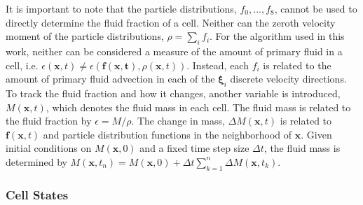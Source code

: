 \documentclass[pdftex,ms]{pittetd}
\newcommand{\pos}{\mathbf{x}}
\newcommand{\pvel}{\boldsymbol{\xi}}
\begin{document}
It is important to note that the particle distributions, $f_0, ..., f_8$, cannot be used to directly determine the fluid fraction of a cell.
Neither can the zeroth velocity moment of the particle distributions, $\rho = \sum_i f_i$.
For the algorithm used in this work, neither can be considered a measure of the amount of primary fluid in a cell, i.e. $\epsilon(\pos, t) \neq \epsilon(\mathbf{f(\pos, t)}, \rho(\pos, t))$.
Instead, each $f_i$ is related to the amount of primary fluid advection in each of the $\pvel_i$ discrete velocity directions.
To track the fluid fraction and how it changes, another variable is introduced, $M(\pos, t)$, which denotes the fluid mass in each cell.
The fluid mass is related to the fluid fraction by $\epsilon = M / \rho$.
The change in mass, $\Delta M(\pos, t)$ is related to $\mathbf{f}(\pos, t)$ and particle distribution functions in the neighborhood of $\pos$.
Given initial conditions on $M(\pos, 0)$ and a fixed time step size $\Delta t $, the fluid mass is determined by $M(\pos, t_n) = M(\pos, 0) + \Delta t \sum_{k=1}^n \Delta M(\pos, t_k)$.

\newcommand{\opidx}{{\bar{i}}}
\newcommand{\fset}{\mathcal{F}}
\newcommand{\iset}{\mathcal{I}}
\newcommand{\gset}{\mathcal{G}}
\newcommand{\domain}{\mathcal{X}}

\subsubsection{Cell States} \label{sec:mass-transfer}
\end{document}
